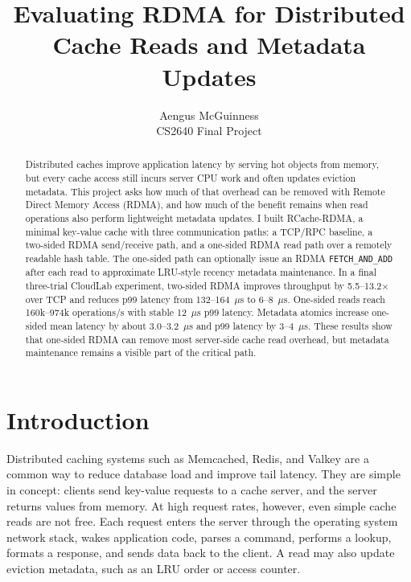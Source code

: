 \documentclass[letterpaper,twocolumn,10pt]{article}
\newcommand{\sys}{RCache-RDMA}
\begin{document}

\date{}

\title{\Large \bf Evaluating RDMA for Distributed Cache Reads and Metadata Updates}

\author{
{\rm Aengus McGuinness}\\
CS2640 Final Project
}

\maketitle

\begin{abstract}
Distributed caches improve application latency by serving hot objects from
memory, but every cache access still incurs server CPU work and often updates
eviction metadata.  This project asks how much of that overhead can be removed
with Remote Direct Memory Access (RDMA), and how much of the benefit remains
when read operations also perform lightweight metadata updates.  I built
\sys{}, a minimal key-value cache with three communication paths: a TCP/RPC
baseline, a two-sided RDMA send/receive path, and a one-sided RDMA read path
over a remotely readable hash table.  The one-sided path can optionally issue
an RDMA \texttt{FETCH\_AND\_ADD} after each read to approximate LRU-style
recency metadata maintenance.  In a final three-trial CloudLab experiment,
two-sided RDMA improves throughput by 5.5--13.2$\times$ over TCP and reduces
p99 latency from 132--164~$\mu$s to 6--8~$\mu$s.  One-sided reads reach
160k--974k operations/s with stable 12~$\mu$s p99 latency.  Metadata atomics
increase one-sided mean latency by about 3.0--3.2~$\mu$s and p99 latency by
3--4~$\mu$s.  These results show that one-sided RDMA can remove most
server-side cache read overhead, but metadata maintenance remains a visible
part of the critical path.
\end{abstract}

\section{Introduction}

Distributed caching systems such as Memcached, Redis, and Valkey are a common
way to reduce database load and improve tail latency.  They are simple in
concept: clients send key-value requests to a cache server, and the server
returns values from memory.  At high request rates, however, even simple cache
reads are not free.  Each request enters the server through the operating
system network stack, wakes application code, parses a command, performs a
lookup, formats a response, and sends data back to the client.  A read may
also update eviction metadata, such as an LRU order or access counter.
\end{document}
